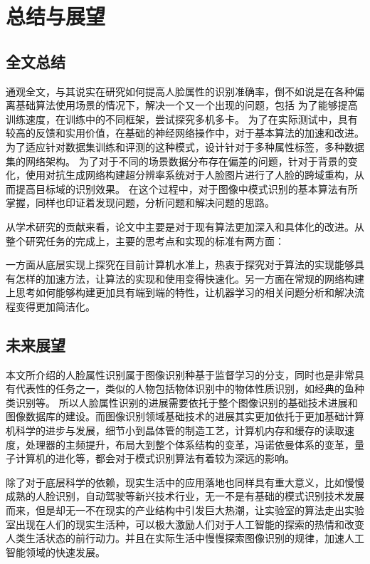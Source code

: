 \chapter{总结与展望}
\section{全文总结}
通观全文，与其说实在研究如何提高人脸属性的识别准确率，倒不如说是在各种偏离基础算法使用场景的情况下，解决一个又一个出现的问题，包括
为了能够提高训练速度，在训练中的不同框架，尝试探究多机多卡。
为了在实际测试中，具有较高的反馈和实用价值，在基础的神经网络操作中，对于基本算法的加速和改进。
为了适应针对数据集训练和评测的这种模式，设计针对于多种属性标签，多种数据集的网络架构。
为了对于不同的场景数据分布存在偏差的问题，针对于背景的变化，使用对抗生成网络构建超分辨率系统对于人脸图片进行了人脸的跨域重构，从而提高目标域的识别效果。
在这个过程中，对于图像中模式识别的基本算法有所掌握，同样也印证着发现问题，分析问题和解决问题的思路。

从学术研究的贡献来看，论文中主要是对于现有算法更加深入和具体化的改进。从整个研究任务的完成上，主要的思考点和实现的标准有两方面：

一方面从底层实现上探究在目前计算机水准上，热衷于探究对于算法的实现能够具有怎样的加速方法，让算法的实现和使用变得快速化。另一方面在常规的网络构建上思考如何能够构建更加具有端到端的特性，让机器学习的相关问题分析和解决流程变得更加简洁化。


\section{未来展望}
本文所介绍的人脸属性识别属于图像识别种基于监督学习的分支，同时也是非常具有代表性的任务之一，类似的人物包括物体识别中的物体性质识别，如经典的鱼种类识别等。
所以人脸属性识别的进展需要依托于整个图像识别的基础技术进展和图像数据库的建设。而图像识别领域基础技术的进展其实更加依托于更加基础计算机科学的进步与发展，细节小到晶体管的制造工艺，计算机内存和缓存的读取速度，处理器的主频提升，布局大到整个体系结构的变革，冯诺依曼体系的变革，量子计算机的进化等，都会对于模式识别算法有着较为深远的影响。

除了对于底层科学的依赖，现实生活中的应用落地也同样具有重大意义，比如慢慢成熟的人脸识别，自动驾驶等新兴技术行业，无一不是有基础的模式识别技术发展而来，但是却无一不在现实的产业结构中引发巨大热潮，让实验室的算法走出实验室出现在人们的现实生活种，可以极大激励人们对于人工智能的探索的热情和改变人类生活状态的前行动力。并且在实际生活中慢慢探索图像识别的规律，加速人工智能领域的快速发展。



 

